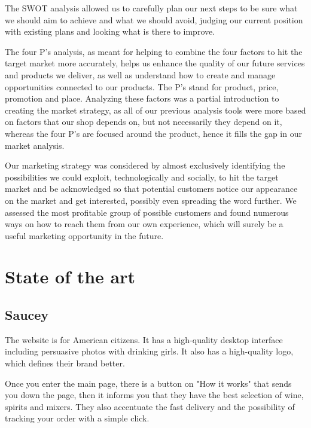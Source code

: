 \documentclass[12p]{article}
\begin{document}
The SWOT analysis allowed us to carefully plan our next steps to be sure what we should aim to achieve and what we should avoid, judging our current position with existing plans and looking what is there to improve. 

The four P’s analysis, as meant for helping to combine the four factors to hit the target market more accurately, helps us enhance the quality of our future services and products we deliver, as well as understand how to create and manage opportunities connected to our products. The P’s stand for product, price, promotion and place. Analyzing these factors was a partial introduction to creating the market strategy, as all of our previous analysis tools were more based on factors that our shop depends on, but not necessarily they depend on it, whereas the four P’s are focused around the product, hence it fills the gap in our market analysis.

Our marketing strategy was considered by almost exclusively identifying the possibilities we could exploit, technologically and socially, to hit the target market and be acknowledged so that potential customers notice our appearance on the market and get interested, possibly even spreading the word further. We assessed the most profitable group of possible customers and found numerous ways on how to reach them from our own experience, which will surely be a useful marketing opportunity in the future.


\newpage
\section{State of the art}

\subsection{Saucey \cite{Saucey}}
The website is for American citizens. It has a high-quality desktop interface including persuasive photos with drinking girls. It also has a high-quality logo, which defines their brand better.

Once you enter the main page, there is a button on "How it works" that sends you down the page, then it informs you that they have the best selection of wine, spirits and mixers. They also accentuate the fast delivery and the possibility of tracking your order with a simple click.
\end{document}

